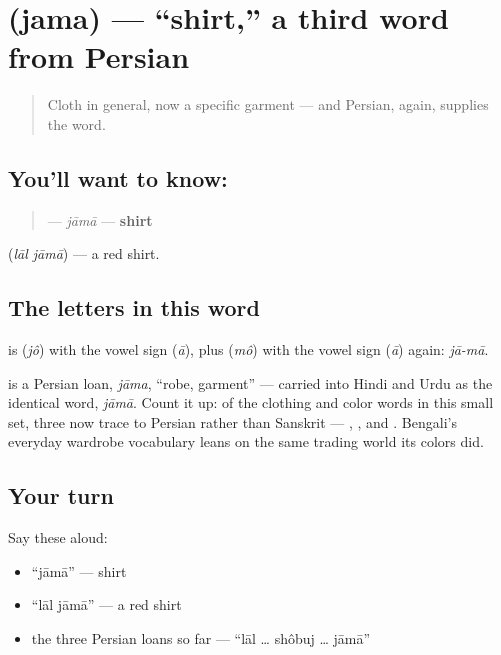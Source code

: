 \section[jama]{ (jama) — \textquotedblleft{}shirt,\textquotedblright{} a third word from Persian}

\label{lesson:BN-C15-jama}



\begin{quote}
Cloth in general, now a specific garment — and Persian, again, supplies the word.
\end{quote}

\subsection*{You'll want to know: }
\begin{quote}
\textbf{} — \emph{jāmā} — \textbf{shirt}
\end{quote}

  (\emph{lāl jāmā}) — a red shirt.

\subsection*{The letters in this word}
\textbf{} is \textbf{} (\emph{jô}) with the vowel sign \textbf{} (\emph{ā}), plus \textbf{} (\emph{mô}) with the vowel sign \textbf{} (\emph{ā}) again: \emph{jā-mā}.

\begin{cousinweb}
\textbf{} is a Persian loan, \emph{jāma}, \textquotedblleft{}robe, garment\textquotedblright{} — carried into Hindi and Urdu as the identical word, \emph{jāmā}. Count it up: of the clothing and color words in this small set, three now trace to Persian rather than Sanskrit — \textbf{}, \textbf{}, and \textbf{}. Bengali's everyday wardrobe vocabulary leans on the same trading world its colors did.
\end{cousinweb}

\subsection*{Your turn}
Say these aloud:

\begin{itemize}
\raggedright
  \item \textquotedblleft{}jāmā\textquotedblright{} — shirt
  \item \textquotedblleft{}lāl jāmā\textquotedblright{} — a red shirt
  \item the three Persian loans so far — \textquotedblleft{}lāl … shôbuj … jāmā\textquotedblright{}
\end{itemize}

